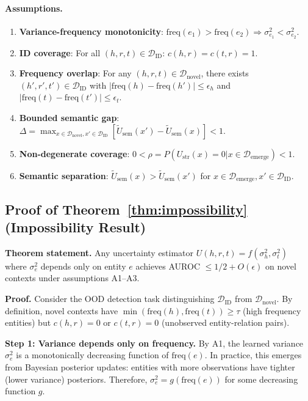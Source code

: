 \documentclass[accepted]{uai2024}  %
\newcommand{\freq}{\text{freq}}
\begin{document}
\paragraph{Assumptions.}
\begin{enumerate}
    \item[\textbf{(A1)}] \textbf{Variance-frequency monotonicity}: $\freq(e_1) > \freq(e_2) \Rightarrow \sigma^2_{e_1} < \sigma^2_{e_2}$.
    \item[\textbf{(A2)}] \textbf{ID coverage}: For all $(h,r,t) \in \mathcal{D}_{\text{ID}}$: $c(h,r) = c(t,r) = 1$.
    \item[\textbf{(A3)}] \textbf{Frequency overlap}: For any $(h,r,t) \in \mathcal{D}_{\text{novel}}$, there exists $(h',r',t') \in \mathcal{D}_{\text{ID}}$ with $|\freq(h) - \freq(h')| \leq \epsilon_h$ and $|\freq(t) - \freq(t')| \leq \epsilon_t$.
    \item[\textbf{(A4)}] \textbf{Bounded semantic gap}: $\Delta = \max_{x \in \mathcal{D}_{\text{novel}}, x' \in \mathcal{D}_{\text{ID}}} [\tilde{U}_{\text{sem}}(x') - \tilde{U}_{\text{sem}}(x)] < 1$.
    \item[\textbf{(A5)}] \textbf{Non-degenerate coverage}: $0 < \rho = P(U_{\text{str}}(x) = 0 | x \in \mathcal{D}_{\text{emerge}}) < 1$.
    \item[\textbf{(A6)}] \textbf{Semantic separation}: $\tilde{U}_{\text{sem}}(x) > \tilde{U}_{\text{sem}}(x')$ for $x \in \mathcal{D}_{\text{emerge}}, x' \in \mathcal{D}_{\text{ID}}$.
\end{enumerate}

\subsection{Proof of Theorem~\ref{thm:impossibility} (Impossibility Result)}

\textbf{Theorem statement.} Any uncertainty estimator $U(h,r,t) = f(\sigma^2_h, \sigma^2_t)$ where $\sigma^2_e$ depends only on entity $e$ achieves AUROC $\leq 1/2 + O(\epsilon)$ on novel contexts under assumptions A1--A3.

\textbf{Proof.} Consider the OOD detection task distinguishing $\mathcal{D}_{\text{ID}}$ from $\mathcal{D}_{\text{novel}}$. By definition, novel contexts have $\min(\freq(h), \freq(t)) \geq \tau$ (high frequency entities) but $c(h,r) = 0$ or $c(t,r) = 0$ (unobserved entity-relation pairs).

\textbf{Step 1: Variance depends only on frequency.} By A1, the learned variance $\sigma^2_e$ is a monotonically decreasing function of $\freq(e)$. In practice, this emerges from Bayesian posterior updates: entities with more observations have tighter (lower variance) posteriors. Therefore, $\sigma^2_e = g(\freq(e))$ for some decreasing function $g$.
\end{document}

